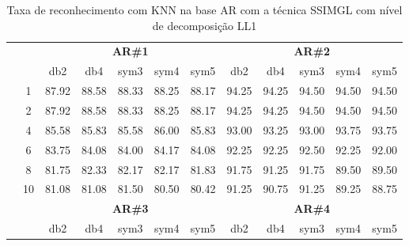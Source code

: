 
















\begin{table}[H]
	\centering
    \normalsize
	\caption{Taxa de reconhecimento com KNN na base AR com a técnica SSIMGL com nível de decomposição LL1}
	\begin{tabular}{|c|c|c c c c c|c c c c c|}
\cline{3-12}
\multicolumn{2}{c|}{\multirow{2}{*}{}} & \multicolumn{5}{c|}{\textbf{AR\#1}}  & \multicolumn{5}{c|}{\textbf{AR\#2}} \\\cline{3-12}

\multicolumn{2}{c|}{}  & db2 & db4 & sym3 & sym4 & sym5 & db2 & db4& sym3 & sym4 & sym5 \\\hline

\multicolumn{1}{|c|}{ \multirow{5}{*}{\rotatebox[origin=c]{90}{\textbf{K-vizinhos}}} }
&1	&87.92	&88.58	&88.33	&88.25	&88.17	&94.25	&94.25	&94.50	&94.50	&94.50\\\cline{2-12}
&2	&87.92	&88.58	&88.33	&88.25	&88.17	&94.25	&94.25	&94.50	&94.50	&94.50\\\cline{2-12}
&4	&85.58	&85.83	&85.58	&86.00	&85.83	&93.00	&93.25	&93.00	&93.75	&93.75\\\cline{2-12}
&6	&83.75	&84.08	&84.00	&84.17	&84.08	&92.25	&92.25	&92.50	&92.25	&92.00\\\cline{2-12}
&8	&81.75	&82.33	&82.17	&82.17	&81.83	&91.75	&91.25	&91.75	&89.50	&89.50\\\cline{2-12}
&10	&81.08	&81.08	&81.50	&80.50	&80.42	&91.25	&90.75	&91.25	&89.25	&88.75%


\\\midrule




\cline{3-12}
\multicolumn{2}{c}{} & \multicolumn{5}{|c|}{\textbf{AR\#3}}  & \multicolumn{5}{c|}{\textbf{AR\#4}} \\\cline{3-12}
\multicolumn{2}{c}{}  & \multicolumn{1}{|c}{db2} & db4 & sym3 & sym4 & sym5 & db2 & db4& sym3 & sym4 & sym5 \\\hline


\end{tabular}
\end{table}
